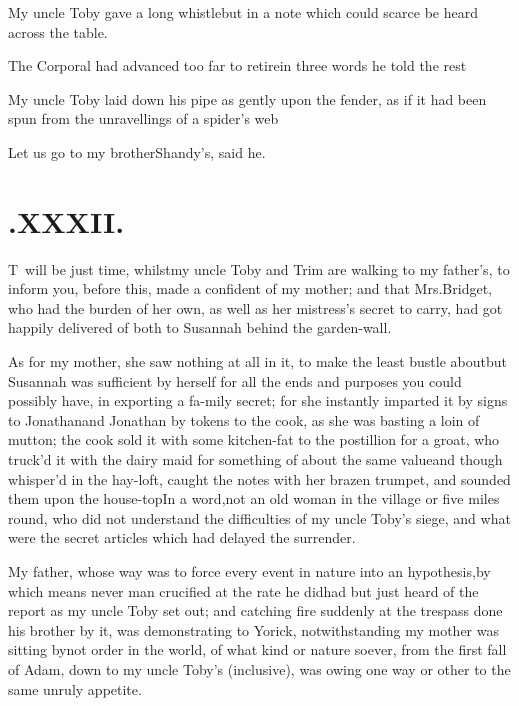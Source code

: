 \documentclass{article}
\begin{document}
\newpage
\noindent
{}

My uncle Toby gave a long whistle\break\tsh but in a
note which could scarce be heard across the table.

The Corporal had advanced too far to retire\tsh in
three words he told the rest\tsh

My uncle Toby laid down his pipe\break
as gently upon the fender, as if it had\break
been spun from the unravellings of a\break
spider’s web\tsh

\tsh Let us go to my brother\break Shandy’s,
said he.

\newpage
\section{.\enspace XXXII.}

\lettrine{T}{\,} will be just time, whilst\break my
uncle Toby and Trim are walking to my father’s,
to inform you,\break
{} before this,
made a confident of my mother; and that Mrs.\@ Bridget, who
had the burden of her own, as well as her mistress’s secret
to carry, had got happily delivered of both to Susannah
behind the garden-wall.

As for my mother, she saw nothing at all in it, to make the
least bustle about\break\tsh but Susannah was sufficient
by herself for all the ends and purposes you could possibly have,
in exporting a fa-\pb mily secret; for she instantly imparted it by
signs to Jonathan\tsh and Jonathan by tokens
to the cook, as she was basting a loin of mutton; the cook sold it
with some kitchen-fat to the postillion for a groat, who
truck’d it with the dairy maid for something of about the
same value\tsh and though whisper’d in the hay-loft,
 caught the notes with her brazen trumpet, and
sounded them upon the house-top\tsk In a word,\break not an old woman
in the village or five miles round, who did not understand the
difficulties of my uncle Toby’s siege, and what were
the secret articles which had delayed the
surrender.\tsh

My father, whose way was to force every event in nature into an
hypothesis,\pb by which means never man crucified 
at the rate he did\tsh had but just heard of the report as
my uncle Toby set out; and catching fire suddenly at
the trespass done his brother by it, was demonstrating to
Yorick, notwithstanding my mother was sitting
by\tsh not\break
{}
order in the world, of what kind or nature soever, from
the first fall of Adam, down to my uncle Toby’s
(inclusive), was owing one way or other to the same unruly
appetite.
\end{document}
